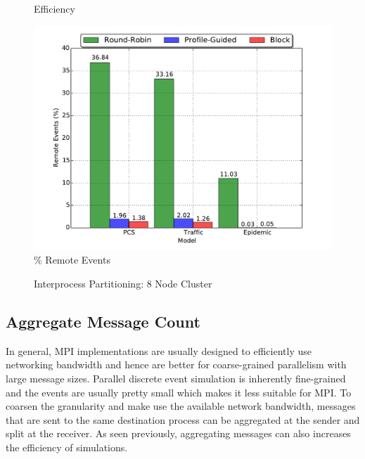 \documentclass[11pt]{book}
\begin{document}
\begin{figure}
\begin{minipage}{.5\textwidth}
\begin{center}
      Efficiency \\
    \end{center}
  \end{minipage}
  \centering
  \begin{minipage}{.5\textwidth}
    \begin{center}
      \includegraphics[width=\textwidth,keepaspectratio,quiet]{figs/partitioning_communication/partitioning_premote_8node.pdf} \\
      \% Remote Events \\
    \end{center}
  \end{minipage}
  \caption{Interprocess Partitioning: 8 Node Cluster}\label{partitioning_8node}
\end{figure}

\subsection{Aggregate Message Count}

In general, MPI implementations are usually designed to efficiently use networking bandwidth
and hence are better for coarse-grained parallelism with large message sizes. Parallel discrete
event simulation is inherently fine-grained and the events are usually pretty small which makes
it less suitable for MPI. To coarsen the granularity and make use the available network bandwidth,
messages that are sent to the same destination process can be aggregated at the sender and
split at the receiver. As seen previously, aggregating messages can also increases the efficiency
of simulations.
\end{document}
